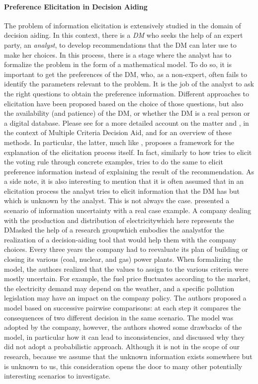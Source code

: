 \paragraph{Preference Elicitation in Decision Aiding}
The problem of information elicitation is extensively studied in the domain of decision aiding. In this context, there is a \textit{\ac{DM}} who seeks the help of an expert party, an \textit{analyst}, to develop recommendations that the \ac{DM} can later use to make her choices. In this process, there is a stage where the analyst has to formalize the problem in the form of a mathematical model. To do so, it is important to get the preferences of the \ac{DM}, who, as a non-expert, often fails to identify the parameters relevant to the problem. It is the job of the analyst to ask the right questions to obtain the preference information.
Different approaches to elicitation have been proposed based on the choice of those questions, but also the availability (and patience) of the \ac{DM}, or whether the \ac{DM} is a real person or a digital database.
Please see \citet{Bouyssou2006} for a more detailed account on the matter and \citet{Mousseau2005}, in the context of Multiple Criteria Decision Aid, and \citet{Belahcene2018} for an overview of these methods. In particular, the latter, much like \citet{Cailloux2014}, proposes a framework for the explanation of the elicitation process itself. In fact, similarly to how \citet{Cailloux2014} tries to elicit the voting rule through concrete examples, \citet{Belahcene2018} tries to do the same to elicit preference information instead of explaining the result of the recommendation.
As a side note, it is also interesting to mention that it is often assumed that in an elicitation process the analyst tries to elicit information that the \ac{DM} has but which is unknown by the analyst. This is not always the case. 
\citet[Ch. 8]{Bouyssou2000} presented a scenario of information uncertainty with a real case example. A company dealing with the production and distribution of electricity\textemdash which here represents the \ac{DM}\textemdash asked the help of a research group\textemdash which embodies the analyst\textemdash for the realization of a decision-aiding tool that would help them with the company choices. Every three years the company had to reevaluate its plan of building or closing its various (coal, nuclear, and gas) power plants. When formalizing the model, the authors realized that the values to assign to the various criteria were mostly uncertain. For example, the fuel price fluctuates according to the market, the electricity demand may depend on the weather, and a specific pollution legislation may have an impact on the company policy. The authors proposed a model based on successive pairwise comparisons: at each step it compares the consequences of two different decision in the same scenario. The model was adopted by the company, however, the authors showed some drawbacks of the model, in particular how it can lead to inconsistencies, and discussed why they did not adopt a probabilistic approach. Although it is not in the scope of our research, because we assume that the unknown information exists somewhere but is unknown to us, this consideration opens the door to many other potentially interesting scenarios to investigate.

